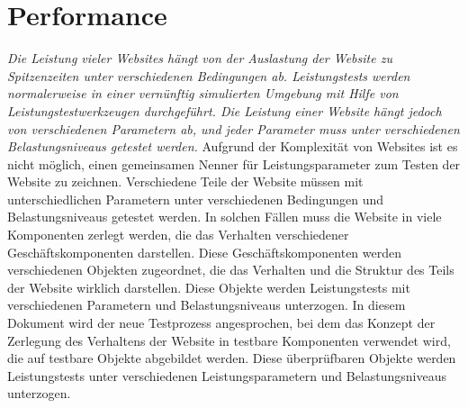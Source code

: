 \section{Performance}
\label{sec:performance}
%
\textit{Die Leistung vieler Websites hängt von der Auslastung der Website zu Spitzenzeiten unter verschiedenen Bedingungen ab. Leistungstests werden normalerweise in einer vernünftig simulierten Umgebung mit Hilfe von Leistungstestwerkzeugen durchgeführt. Die Leistung einer Website hängt jedoch von verschiedenen Parametern ab, und jeder Parameter muss unter verschiedenen Belastungsniveaus getestet werden.} Aufgrund der Komplexität von Websites ist es nicht möglich, einen gemeinsamen Nenner für Leistungsparameter zum Testen der Website zu zeichnen. Verschiedene Teile der Website müssen mit unterschiedlichen Parametern unter verschiedenen Bedingungen und Belastungsniveaus getestet werden. In solchen Fällen muss die Website in viele Komponenten zerlegt werden, die das Verhalten verschiedener Geschäftskomponenten darstellen. Diese Geschäftskomponenten werden verschiedenen Objekten zugeordnet, die das Verhalten und die Struktur des Teils der Website wirklich darstellen. Diese Objekte werden Leistungstests mit verschiedenen Parametern und Belastungsniveaus unterzogen. In diesem Dokument wird der neue Testprozess angesprochen, bei dem das Konzept der Zerlegung des Verhaltens der Website in testbare Komponenten verwendet wird, die auf testbare Objekte abgebildet werden. Diese überprüfbaren Objekte werden Leistungstests unter verschiedenen Leistungsparametern und Belastungsniveaus unterzogen.